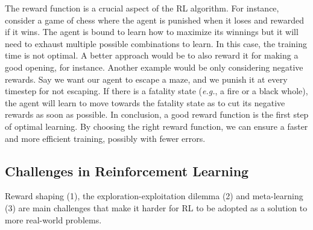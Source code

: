 \medskip 

The reward function is a crucial aspect of the RL algorithm. For instance, consider a game of chess 
where the agent is punished when it loses and rewarded if it wins. The agent is bound to learn how to 
maximize its winnings but it will need to exhaust multiple possible combinations to learn. In this case, 
the training time is not optimal. A better approach would be to also reward it for making a good opening, for instance. 
Another example would be only considering negative rewards. Say we want our agent to escape a maze, and we punish it at every timestep for not escaping. 
If there is a fatality state (\emph{e.g.}, a fire or a black whole), the agent will learn to move towards the fatality state as to cut its negative rewards as soon as possible. 
In conclusion, a good reward function is the first step of optimal learning. By choosing the right reward function, 
we can ensure a faster and more efficient training, possibly with fewer errors. 

\subsection{Challenges in Reinforcement Learning}
\label{sec:challenges}

Reward shaping (1), the exploration-exploitation dilemma (2) and
meta-learning (3) are main challenges
that make it harder for RL to be adopted as a solution to more real-world problems. 

\medskip 


